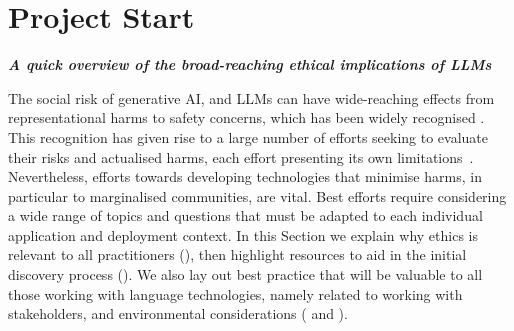 \section{Project Start}\label{sec:start}
\noindent\textbf{\textit{A quick overview of the broad-reaching ethical implications of LLMs}}\newline

\noindent 
The social risk of generative AI, and LLMs can have wide-reaching effects from representational harms to safety concerns, which has been widely recognised \citet[see e.g.,][]{weidinger_ethical_2021,bender_dangers_2021,uzun_are_2023,wei_ai_2022}.
This recognition has given rise to a large number of efforts seeking to evaluate their risks and actualised harms, each effort presenting its own limitations~\cite{Solaiman_Evaluating_2024, goldfarb-tarrant_this_2023, blodgett_language_2020}.
Nevertheless, efforts towards developing technologies that minimise harms, in particular to marginalised communities, are vital.
Best efforts require considering a wide range of topics and questions that must be adapted to each individual application and deployment context. In this Section we explain why ethics is relevant to all practitioners (), then highlight resources to aid in the initial discovery process (). We also lay out best practice that will be valuable to all those working with language technologies, namely related to working with stakeholders, and environmental considerations ( and ).




